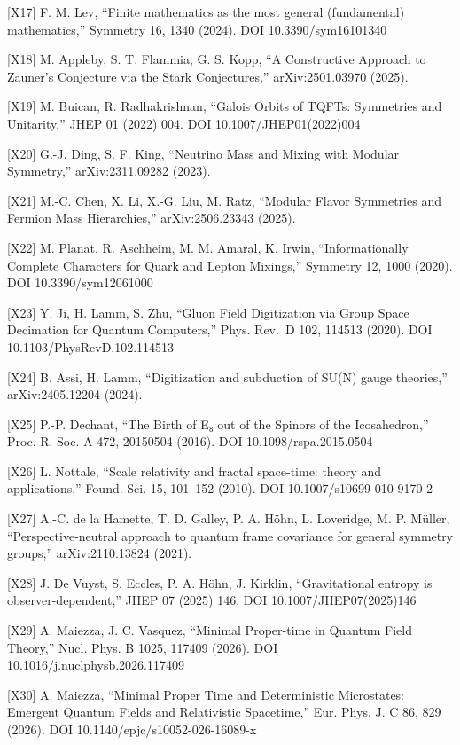 \documentclass[
  a4paper,
]{article}
\begin{document}
{[}X17{]} F. M. Lev, ``Finite mathematics as the most general
(fundamental) mathematics,'' Symmetry 16, 1340 (2024). DOI
10.3390/sym16101340

{[}X18{]} M. Appleby, S. T. Flammia, G. S. Kopp, ``A Constructive
Approach to Zauner's Conjecture via the Stark Conjectures,''
arXiv:2501.03970 (2025).

{[}X19{]} M. Buican, R. Radhakrishnan, ``Galois Orbits of TQFTs:
Symmetries and Unitarity,'' JHEP 01 (2022) 004. DOI
10.1007/JHEP01(2022)004

{[}X20{]} G.-J. Ding, S. F. King, ``Neutrino Mass and Mixing with
Modular Symmetry,'' arXiv:2311.09282 (2023).

{[}X21{]} M.-C. Chen, X. Li, X.-G. Liu, M. Ratz, ``Modular Flavor
Symmetries and Fermion Mass Hierarchies,'' arXiv:2506.23343 (2025).

{[}X22{]} M. Planat, R. Aschheim, M. M. Amaral, K. Irwin,
``Informationally Complete Characters for Quark and Lepton Mixings,''
Symmetry 12, 1000 (2020). DOI 10.3390/sym12061000

{[}X23{]} Y. Ji, H. Lamm, S. Zhu, ``Gluon Field Digitization via Group
Space Decimation for Quantum Computers,'' Phys. Rev.~D 102, 114513
(2020). DOI 10.1103/PhysRevD.102.114513

{[}X24{]} B. Assi, H. Lamm, ``Digitization and subduction of SU(N) gauge
theories,'' arXiv:2405.12204 (2024).

{[}X25{]} P.-P. Dechant, ``The Birth of E₈ out of the Spinors of the
Icosahedron,'' Proc. R. Soc. A 472, 20150504 (2016). DOI
10.1098/rspa.2015.0504

{[}X26{]} L. Nottale, ``Scale relativity and fractal space-time: theory
and applications,'' Found. Sci. 15, 101--152 (2010). DOI
10.1007/s10699-010-9170-2

{[}X27{]} A.-C. de la Hamette, T. D. Galley, P. A. Höhn, L. Loveridge,
M. P. Müller, ``Perspective-neutral approach to quantum frame covariance
for general symmetry groups,'' arXiv:2110.13824 (2021).

{[}X28{]} J. De Vuyst, S. Eccles, P. A. Höhn, J. Kirklin,
``Gravitational entropy is observer-dependent,'' JHEP 07 (2025) 146. DOI
10.1007/JHEP07(2025)146

{[}X29{]} A. Maiezza, J. C. Vasquez, ``Minimal Proper-time in Quantum
Field Theory,'' Nucl. Phys. B 1025, 117409 (2026). DOI
10.1016/j.nuclphysb.2026.117409

{[}X30{]} A. Maiezza, ``Minimal Proper Time and Deterministic
Microstates: Emergent Quantum Fields and Relativistic Spacetime,'' Eur.
Phys. J. C 86, 829 (2026). DOI 10.1140/epjc/s10052-026-16089-x
\end{document}
